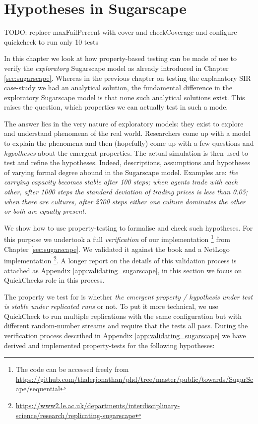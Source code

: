 \chapter{Hypotheses in Sugarscape}
\label{ch:prop_exploratory}

TODO: replace maxFailPercent with cover and checkCoverage and configure quickcheck to run only 10 tests

In this chapter we look at how property-based testing can be made of use to verify the \textit{exploratory} Sugarscape model \cite{epstein_growing_1996} as already introduced in Chapter \ref{sec:sugarscape}. Whereas in the previous chapter on testing the explanatory SIR case-study we had an analytical solution, the fundamental difference in the exploratory Sugarscape model is that none such analytical solutions exist. This raises the question, which properties we can actually test in such a mode.

The answer lies in the very nature of exploratory models: they exist to explore and understand phenomena of the real world. Researchers come up with a model to explain the phenomena and then (hopefully) come up with a few questions and  \textit{hypotheses} about the emergent properties. The actual simulation is then used to test and refine the hypotheses. Indeed, descriptions, assumptions and hypotheses of varying formal degree abound in the Sugarscape model. Examples are: \textit{the carrying capacity becomes stable after 100 steps; when agents trade with each other, after 1000 steps the standard deviation of trading prices is less than 0.05; when there are cultures, after 2700 steps either one culture dominates the other or both are equally present}. 

We show how to use property-testing to formalise and check such hypotheses. For this purpose we undertook a full \textit{verification} of our implementation \footnote{The code can be accessed freely from \url{https://github.com/thalerjonathan/phd/tree/master/public/towards/SugarScape/sequential}} from Chapter \ref{sec:sugarscape}. We validated it against the book \cite{epstein_growing_1996} and a NetLogo implementation \cite{weaver_replicating_2009} \footnote{\url{https://www2.le.ac.uk/departments/interdisciplinary-science/research/replicating-sugarscape}}. A longer report on the details of this validation process is attached as Appendix \ref{app:validating_sugarscape}, in this section we focus on QuickChecks role in this process.

The property we test for is whether \textit{the emergent property / hypothesis under test is stable under replicated runs} or not. To put it more technical, we use QuickCheck to run multiple replications with the same configuration but with different random-number streams and require that the tests all pass. During the verification process described in Appendix \ref{app:validating_sugarscape} we have derived and implemented property-tests for the following hypotheses:

